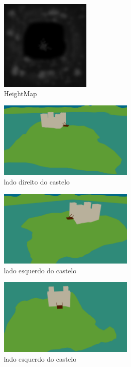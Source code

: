\documentclass[a4paper]{report}
\begin{document}
\begin{figure}[H]
    \centering 
    \includegraphics[width=0.4\textwidth]{images/terreno2.jpg}  
    \caption{HeightMap}
\end{figure}

\begin{figure}[H]
    \centering 
    \includegraphics[width=0.6\textwidth]{images/side_castle.png}  
    \caption{lado direito do castelo}
\end{figure}

\begin{figure}[H]
    \centering 
    \includegraphics[width=0.6\textwidth]{images/side2_castle.png}  
    \caption{lado esquerdo do castelo}
\end{figure}

\begin{figure}[H]
    \centering 
    \includegraphics[width=0.6\textwidth]{images/front_castle.png}  
    \caption{lado esquerdo do castelo}
\end{figure}
\end{document}
